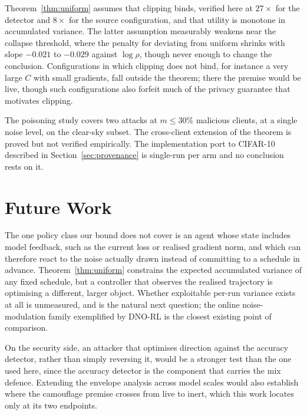 Theorem~\ref{thm:uniform} assumes that clipping binds, verified here at
$27\times$ for the detector and $8\times$ for the source configuration, and that
utility is monotone in accumulated variance. The latter assumption measurably
weakens near the collapse threshold, where the penalty for deviating from
uniform shrinks with slope $-0.021$ to $-0.029$ against $\log\rho$, though never
enough to change the conclusion. Configurations in which clipping does not bind,
for instance a very large $C$ with small gradients, fall outside the theorem;
there the premise would be live, though such configurations also forfeit much of
the privacy guarantee that motivates clipping.

\vspace{10pt}

The poisoning study covers two attacks at $m\le30\%$ malicious clients, at a
single noise level, on the clear-sky subset. The cross-client extension of the
theorem is proved but not verified empirically. The implementation port to
CIFAR-10 described in Section~\ref{sec:provenance} is single-run per arm and no
conclusion rests on it.

\section{Future Work}
\label{sec:future}

The one policy class our bound does not cover is an agent whose state includes
model feedback, such as the current loss or realised gradient norm, and which
can therefore react to the noise actually drawn instead of committing to a
schedule in advance. Theorem~\ref{thm:uniform} constrains the expected
accumulated variance of any fixed schedule, but a controller that observes the
realised trajectory is optimising a different, larger object. Whether
exploitable per-run variance exists at all is unmeasured, and is the natural
next question; the online noise-modulation family exemplified by DNO-RL
\cite{WangDNORL} is the closest existing point of comparison.

\vspace{10pt}

On the security side, an attacker that optimises direction against the accuracy
detector, rather than simply reversing it, would be a stronger test than the one
used here, since the accuracy detector is the component that carries the mix
defence. Extending the envelope analysis across model scales would also
establish where the camouflage premise crosses from live to inert, which this
work locates only at its two endpoints.

